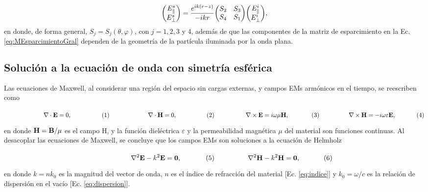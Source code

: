 	\begin{align}
	\mqty(E_{\parallel}^s\\E_{\perp}^s) = 
		\frac{e^{ik(r-z)}}{-ikr} \mqty(S_2&S_3\\S_4&S_1)
	\mqty(E_{\parallel}^i\\E_{\perp}^i),\label{eq:MEsparcimientoGral}
	\end{align}
en donde, de forma general, $S_j = S_j(\theta,\varphi)$, con $j=1,2,3$ y $4$, además de que las componentes de la matriz de esparcimiento en la Ec. \eqref{eq:MEsparcimientoGral} dependen de la geometría de la partícula iluminada por la onda plana.

	\subsection{Solución a la ecuación de onda con simetría esférica}


Las ecuaciones de Maxwell, al considerar una región del espacio sin cargas externas, y campos EMs armónicos en el tiempo, se reescriben como \cite{jackson1999electrodynamics} 

	\begin{subequations}
	\eqhalf{\nabla\cdot \vb{E} = 0, }
	\eqhalf{\nabla\cdot \vb{H} = 0,}
	\eqhalf{\nabla \times \vb{E} = i\omega\mu \vb{H}, \label{seq:FLArm}}
	\eqhalf{\nabla\times\vb{H} = - i \omega\varepsilon \vb{E}, }	
	\label{eq:MaxwellArm}
	\end{subequations} \vspace*{-1em}
	
\noindent	
en donde $\vb{H} = \vb{B}/\mu$ es el campo H, y la función dieléctrica $\varepsilon$ y la permeabilidad magnética $\mu$ del material son funciones continuas. Al desacoplar las ecuaciones de Maxwell, se concluye que los campos EMs son soluciones a la ecuación de Helmholz 

	\begin{subequations}
	\eqhalf{\nabla^2 \vb{E}- k^2 \vb{E} = \vb{0},}
	\eqhalf{\nabla^2 \vb{H}- k^2 \vb{H} = \vb{0},}
	\label{eq:Helmholtz}
	\end{subequations} \vspace*{-1em}

\noindent	
en donde $k = n k_0$ es la magnitud del vector de onda, $n$ es el índice de refracción del material [Ec. \eqref{eq:indice}] y $k_0 = \omega / c$ es la relación de dispersión en el vacío [Ec. \eqref{eq:dispersion}].

